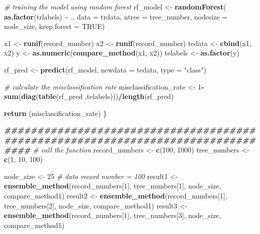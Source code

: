 \documentclass[
]{article}
\newenvironment{Shaded}{\begin{snugshade}}{\end{snugshade}}
\newcommand{\AttributeTok}[1]{\textcolor[rgb]{0.13,0.29,0.53}{#1}}
\newcommand{\CommentTok}[1]{\textcolor[rgb]{0.56,0.35,0.01}{\textit{#1}}}
\newcommand{\ConstantTok}[1]{\textcolor[rgb]{0.56,0.35,0.01}{#1}}
\newcommand{\DecValTok}[1]{\textcolor[rgb]{0.00,0.00,0.81}{#1}}
\newcommand{\DocumentationTok}[1]{\textcolor[rgb]{0.56,0.35,0.01}{\textbf{\textit{#1}}}}
\newcommand{\FunctionTok}[1]{\textcolor[rgb]{0.13,0.29,0.53}{\textbf{#1}}}
\newcommand{\NormalTok}[1]{#1}
\newcommand{\OtherTok}[1]{\textcolor[rgb]{0.56,0.35,0.01}{#1}}
\newcommand{\SpecialCharTok}[1]{\textcolor[rgb]{0.81,0.36,0.00}{\textbf{#1}}}
\newcommand{\StringTok}[1]{\textcolor[rgb]{0.31,0.60,0.02}{#1}}
\begin{document}
\begin{Shaded}
\begin{Highlighting}[]
  \CommentTok{\# training the model using random forest}
\NormalTok{  rf\_model }\OtherTok{\textless{}{-}} \FunctionTok{randomForest}\NormalTok{( }\FunctionTok{as.factor}\NormalTok{(trlabels) }\SpecialCharTok{\textasciitilde{}}\NormalTok{ ., }
                            \AttributeTok{data =}\NormalTok{ trdata, }
                            \AttributeTok{ntree =}\NormalTok{ tree\_number,}
                            \AttributeTok{nodesize =}\NormalTok{ node\_size, }
                            \AttributeTok{keep.forest =} \ConstantTok{TRUE}\NormalTok{)}


\NormalTok{  x1 }\OtherTok{\textless{}{-}} \FunctionTok{runif}\NormalTok{(record\_number)}
\NormalTok{  x2 }\OtherTok{\textless{}{-}} \FunctionTok{runif}\NormalTok{(record\_number)}
\NormalTok{  tedata }\OtherTok{\textless{}{-}} \FunctionTok{cbind}\NormalTok{(x1, x2)}
\NormalTok{  y }\OtherTok{\textless{}{-}} \FunctionTok{as.numeric}\NormalTok{(}\FunctionTok{compare\_method}\NormalTok{(x1, x2))}
\NormalTok{  telabels }\OtherTok{\textless{}{-}} \FunctionTok{as.factor}\NormalTok{(y)}

\NormalTok{  rf\_pred }\OtherTok{\textless{}{-}} \FunctionTok{predict}\NormalTok{(rf\_model, }\AttributeTok{newdata =}\NormalTok{ tedata, }\AttributeTok{type =} \StringTok{"class"}\NormalTok{)}
  
  \CommentTok{\# calculate the misclassification rate  }
\NormalTok{  misclassification\_rate }\OtherTok{\textless{}{-}} \DecValTok{1}\SpecialCharTok{{-}} \FunctionTok{sum}\NormalTok{(}\FunctionTok{diag}\NormalTok{(}\FunctionTok{table}\NormalTok{(rf\_pred ,telabels)))}\SpecialCharTok{/}\FunctionTok{length}\NormalTok{(rf\_pred)}

  \FunctionTok{return}\NormalTok{ (misclassification\_rate)}
\NormalTok{\}}


\DocumentationTok{\#\#\#\#\#\#\#\#\#\#\#\#\#\#\#\#\#\#\#\#\#\#\#\#\#\#\#\#\#\#\#\#\#\#\#\#\#\#\#\#\#\#\#\#\#\#\#\#\#\#\#\#\#\#\#\#\#\#\#\#\#\#\#\#\#\#\#\#\#\#\#\#\#\#\#\#\#\#\#\#}
\CommentTok{\# call the function}
\NormalTok{record\_numbers }\OtherTok{\textless{}{-}} \FunctionTok{c}\NormalTok{(}\DecValTok{100}\NormalTok{, }\DecValTok{1000}\NormalTok{)}
\NormalTok{tree\_numbers }\OtherTok{\textless{}{-}} \FunctionTok{c}\NormalTok{(}\DecValTok{1}\NormalTok{, }\DecValTok{10}\NormalTok{, }\DecValTok{100}\NormalTok{)}

\NormalTok{node\_size }\OtherTok{\textless{}{-}} \DecValTok{25}
\CommentTok{\# data record number = 100}
\NormalTok{result1 }\OtherTok{\textless{}{-}} \FunctionTok{ensemble\_method}\NormalTok{(record\_numbers[}\DecValTok{1}\NormalTok{], tree\_numbers[}\DecValTok{1}\NormalTok{], node\_size, }
\NormalTok{                          compare\_method1)}
\NormalTok{result2 }\OtherTok{\textless{}{-}} \FunctionTok{ensemble\_method}\NormalTok{(record\_numbers[}\DecValTok{1}\NormalTok{], tree\_numbers[}\DecValTok{2}\NormalTok{], node\_size, }
\NormalTok{                          compare\_method1)}
\NormalTok{result3 }\OtherTok{\textless{}{-}} \FunctionTok{ensemble\_method}\NormalTok{(record\_numbers[}\DecValTok{1}\NormalTok{], tree\_numbers[}\DecValTok{3}\NormalTok{], node\_size, }
\NormalTok{                          compare\_method1)}


\end{Highlighting}
\end{Shaded}
\end{document}
